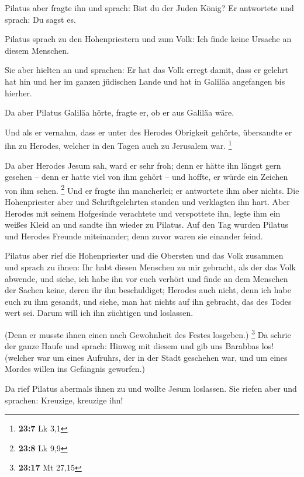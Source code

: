  Pilatus aber fragte ihn und sprach: Bist du der Juden
König? Er antwortete und sprach: Du sagst es.

 Pilatus sprach zu den Hohenpriestern und zum Volk: Ich
finde keine Ursache an diesem Menschen.

 Sie aber hielten an und sprachen: Er hat das Volk erregt
damit, dass er gelehrt hat hin und her im ganzen jüdischen Lande und hat
in Galiläa angefangen bis hierher.

 Da aber Pilatus Galiläa hörte, fragte er, ob er aus Galiläa
wäre.

 Und als er vernahm, dass er unter des Herodes Obrigkeit
gehörte, übersandte er ihn zu Herodes, welcher in den Tagen auch zu
Jerusalem war. \footnote{\textbf{23:7} Lk 3,1}

 Da aber Herodes Jesum sah, ward er sehr froh; denn er hätte
ihn längst gern gesehen -- denn er hatte viel von ihm gehört -- und
hoffte, er würde ein Zeichen von ihm sehen. \footnote{\textbf{23:8} Lk
  9,9}  Und er fragte ihn mancherlei; er antwortete ihm aber
nichts.  Die Hohenpriester aber und Schriftgelehrten
standen und verklagten ihn hart.  Aber Herodes mit seinem
Hofgesinde verachtete und verspottete ihn, legte ihm ein weißes Kleid an
und sandte ihn wieder zu Pilatus.  Auf den Tag wurden
Pilatus und Herodes Freunde miteinander; denn zuvor waren sie einander
feind.

 Pilatus aber rief die Hohenpriester und die Obersten und
das Volk zusammen  und sprach zu ihnen: Ihr habt diesen
Menschen zu mir gebracht, als der das Volk abwende, und siehe, ich habe
ihn vor euch verhört und finde an dem Menschen der Sachen keine, deren
ihr ihn beschuldiget;  Herodes auch nicht, denn ich habe
euch zu ihm gesandt, und siehe, man hat nichts auf ihn gebracht, das des
Todes wert sei.  Darum will ich ihn züchtigen und
loslassen.

 (Denn er musste ihnen einen nach Gewohnheit des Festes
losgeben.) \footnote{\textbf{23:17} Mt 27,15}  Da schrie
der ganze Haufe und sprach: Hinweg mit diesem und gib uns Barabbas los!
 (welcher war um eines Aufruhrs, der in der Stadt geschehen
war, und um eines Mordes willen ins Gefängnis geworfen.)

 Da rief Pilatus abermals ihnen zu und wollte Jesum
loslassen.  Sie riefen aber und sprachen: Kreuzige,
kreuzige ihn!

